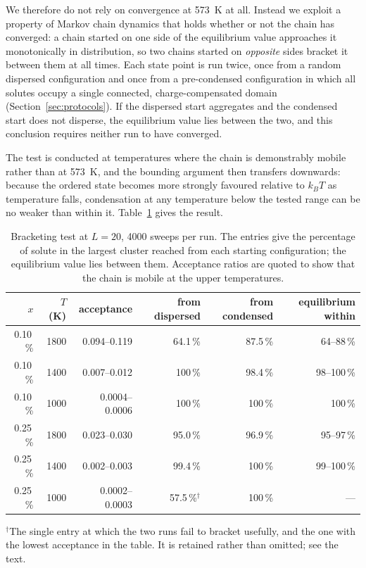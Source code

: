 \documentclass[11pt,a4paper]{article}
\begin{document}
We therefore do not rely on convergence at 573~K at all. Instead we exploit a
property of Markov chain dynamics that holds whether or not the chain has
converged: a chain started on one side of the equilibrium value approaches it
monotonically in distribution, so two chains started on \emph{opposite} sides
bracket it between them at all times. Each state point is run twice, once from a
random dispersed configuration and once from a pre-condensed configuration in
which all solutes occupy a single connected, charge-compensated domain
(Section~\ref{sec:protocols}). If the dispersed start aggregates and the
condensed start does not disperse, the equilibrium value lies between the two,
and this conclusion requires neither run to have converged.

The test is conducted at temperatures where the chain is demonstrably mobile
rather than at 573~K, and the bounding argument then transfers downwards:
because the ordered state becomes more strongly favoured relative to $k_BT$ as
temperature falls, condensation at any temperature below the tested range can be
no weaker than within it. Table~\ref{tab:bracket} gives the result.

\begin{table}[htbp]
\centering
\caption{Bracketing test at $L = 20$, 4000 sweeps per run. The entries give the
percentage of solute in the largest cluster reached from each starting
configuration; the equilibrium value lies between them. Acceptance ratios are
quoted to show that the chain is mobile at the upper temperatures.}
\label{tab:bracket}
\small
\begin{tabular}{rrrrrr}
\toprule
$x$ & $T$ (K) & acceptance & from dispersed & from condensed & equilibrium within \\
\midrule
0.10\,\% & 1800 & 0.094--0.119 & 64.1\,\% & 87.5\,\% & 64--88\,\% \\
0.10\,\% & 1400 & 0.007--0.012 & 100\,\%  & 98.4\,\% & 98--100\,\% \\
0.10\,\% & 1000 & 0.0004--0.0006 & 100\,\% & 100\,\% & 100\,\% \\
0.25\,\% & 1800 & 0.023--0.030 & 95.0\,\% & 96.9\,\% & 95--97\,\% \\
0.25\,\% & 1400 & 0.002--0.003 & 99.4\,\% & 100\,\%  & 99--100\,\% \\
0.25\,\% & 1000 & 0.0002--0.0003 & 57.5\,\%$^{\dagger}$ & 100\,\% & --- \\
\bottomrule
\end{tabular}

\vspace{2pt}
\begin{minipage}{0.92\textwidth}
\footnotesize $^{\dagger}$The single entry at which the two runs fail to
bracket usefully, and the one with the lowest acceptance in the table. It is
retained rather than omitted; see the text.
\end{minipage}
\end{table}
\end{document}

